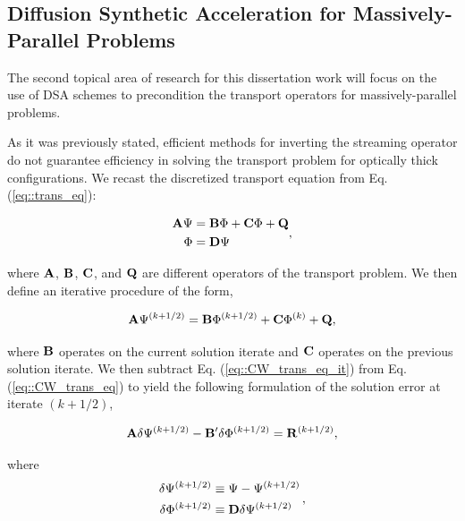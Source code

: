 \documentclass[11pt]{article}
\begin{document}
\subsection{Diffusion Synthetic Acceleration for Massively-Parallel Problems}
\label{sec::CW_DSA}

The second topical area of research for this dissertation work will focus on the use of DSA schemes to precondition the transport operators for massively-parallel problems.

As it was previously stated, efficient methods for inverting the streaming operator do not guarantee efficiency in solving the transport problem for optically thick configurations. We recast the discretized transport equation from Eq. (\ref{eq::trans_eq}):

\begin{equation}
\label{eq::CW_trans_eq}
\begin{aligned}
{\bf A} \Psi &= {\bf B} \Phi +  {\bf C} \Phi + {\bf Q} \\
\Phi &= {\bf D} \Psi
\end{aligned} ,
\end{equation}

\noindent where ${\bf A}$, ${\bf B}$, ${\bf C}$, and ${\bf Q}$ are different operators of the transport problem. We then define an iterative procedure of the form,

\begin{equation}
\label{eq::CW_trans_eq_it}
{\bf A} \Psi^{(k+1/2)} = {\bf B} \Phi^{(k+1/2)} + {\bf C} \Phi^{(k)} + {\bf Q},
\end{equation}

\noindent where ${\bf B}$ operates on the current solution iterate and ${\bf C}$ operates on the previous solution iterate. We then subtract Eq. (\ref{eq::CW_trans_eq_it}) from Eq. (\ref{eq::CW_trans_eq}) to yield the following formulation of the solution error at iterate $(k+1/2)$,

\begin{equation}
\label{eq::CW_trans_eq_it_diff}
{\bf A} \delta \Psi^{(k+1/2)} - {\bf B}' \delta \Phi^{(k+1/2)} = {\bf R}^{(k+1/2)}, 
\end{equation}

\noindent where
\begin{equation}
\label{eq::CW_delta_fluxes}
\begin{aligned}
\delta \Psi^{(k+1/2)} &\equiv  \Psi - \Psi^{(k+1/2)} \\
\delta \Phi^{(k+1/2)} &\equiv {\bf D} \delta \Psi^{(k+1/2)}
\end{aligned} \, ,
\end{equation}
\end{document}
